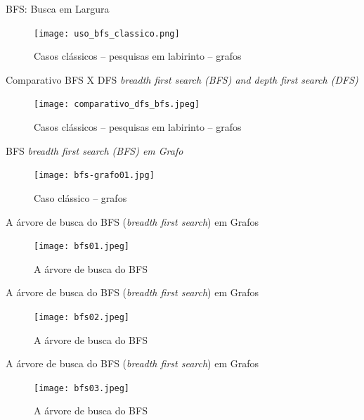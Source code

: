 \begin{frame}[c]{BFS: Busca em Largura} 

		   	\begin{figure}[!htpb]
				\centering
\texttt{[image: uso\_bfs\_classico.png]}
\caption{Casos clássicos -- pesquisas em labirinto -- grafos}
			\end{figure} 
    \end{frame}


\begin{frame}[c]{Comparativo BFS X DFS \textit{breadth first search (BFS) and depth first search (DFS)} }

 	\begin{figure}[!htpb]
	\centering
  \texttt{[image: comparativo\_dfs\_bfs.jpeg]}
 \caption{Casos clássicos -- pesquisas em labirinto -- grafos}
	\end{figure} 
\end{frame}


\begin{frame}[c]{BFS \textit{breadth first search (BFS) em Grafo}}

 	\begin{figure}[!htpb]
	\centering
  \texttt{[image: bfs-grafo01.jpg]}
 \caption{Caso clássico -- grafos}
	\end{figure} 
\end{frame}


\begin{frame}[c]{A árvore de busca do BFS (\textit{breadth first search})  em Grafos}

 	\begin{figure}[!htpb]
	\centering
  \texttt{[image: bfs01.jpeg]}
 \caption{A árvore de busca do BFS}
	\end{figure} 
\end{frame}



\begin{frame}[c]{A árvore de busca do BFS (\textit{breadth first search})  em Grafos}

 	\begin{figure}[!htpb]
	\centering
  \texttt{[image: bfs02.jpeg]}
 \caption{A árvore de busca do BFS}
	\end{figure} 
\end{frame}

\begin{frame}[c]{A árvore de busca do BFS (\textit{breadth first search})  em Grafos}

 	\begin{figure}[!htpb]
	\centering
  \texttt{[image: bfs03.jpeg]}
 \caption{A árvore de busca do BFS}
	\end{figure} 
\end{frame}


